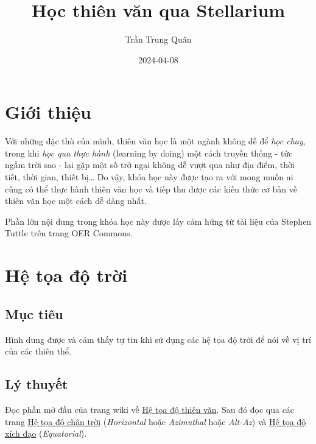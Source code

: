 \documentclass[
  a4paper,
]{book}
\title{Học thiên văn qua Stellarium}
\author{Trần Trung Quân}
\date{2024-04-08}
\begin{document}
\maketitle

{
\setcounter{tocdepth}{1}
\tableofcontents
}
\chapter*{Giới thiệu}\label{giux1edbi-thiux1ec7u}

Với những đặc thù của mình, thiên văn học là một ngành không dễ để \emph{học chay}, trong khi \emph{học qua thực hành} (learning by doing) một cách truyền thống - tức ngắm trời sao - lại gặp một số trở ngại không dễ vượt qua như địa điểm, thời tiết, thời gian, thiết bị\ldots{} Do vậy, khóa học này được tạo ra với mong muốn ai cũng có thể thực hành thiên văn học và tiếp thu được các kiến thức cơ bản về thiên văn học một cách dễ dàng nhất.

Phần lớn nội dung trong khóa học này được lấy cảm hứng từ tài liệu của Stephen Tuttle \citep{stuttle} trên trang OER Commons.

\chapter{Hệ tọa độ trời}\label{hux1ec7-tux1ecda-ux111ux1ed9-trux1eddi}

\section{Mục tiêu}\label{mux1ee5c-tiuxeau}

Hình dung được và cảm thấy tự tin khi sử dụng các hệ tọa độ trời để nói về vị trí của các thiên thể.

\section{Lý thuyết}\label{luxfd-thuyux1ebft}

Đọc phần mở đầu của trang wiki về
\href{https://vi.wikipedia.org/wiki/H\%E1\%BB\%87_t\%E1\%BB\%8Da_\%C4\%91\%E1\%BB\%99_thi\%C3\%AAn_v\%C4\%83n}{Hệ tọa độ thiên văn}.
Sau đó đọc qua các trang
\href{https://vi.wikipedia.org/wiki/H\%E1\%BB\%87_t\%E1\%BB\%8Da_\%C4\%91\%E1\%BB\%99_ch\%C3\%A2n_tr\%E1\%BB\%9Di}{Hệ tọa độ chân trời} (\emph{Horizontal} hoặc \emph{Azimuthal} hoặc \emph{Alt-Az})
và \href{https://vi.wikipedia.org/wiki/H\%E1\%BB\%87_t\%E1\%BB\%8Da_\%C4\%91\%E1\%BB\%99_x\%C3\%ADch_\%C4\%91\%E1\%BA\%A1o}{Hệ tọa độ xích đạo} (\emph{Equatorial}).
\end{document}
